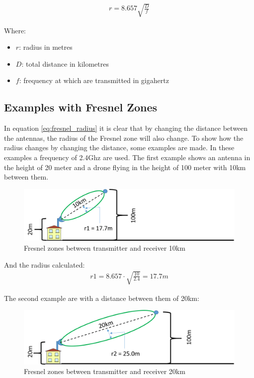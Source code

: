 \begin{align}
r= 8.657 \sqrt{\frac{D}{f}} \label{eq:fresnel_radius}
\end{align}

Where:
\begin{itemize}[label=]
    \item $r$: radius in metres
    \item $D$: total distance in kilometres
    \item $f$: frequency at which are transmitted in gigahertz
\end{itemize}

\subsection{Examples with Fresnel Zones}
\noindent In equation \ref{eq:fresnel_radius} it is clear that by changing the distance between the antennas, the radius of the Fresnel zone will also change. To show how the radius changes by changing the distance, some examples are made. In these examples a frequency of 2.4Ghz are used. The first example shows an antenna in the height of 20 meter and a drone flying in the height of 100 meter with 10km between them.

\begin{figure}[H]
	\centering
	\includegraphics[scale=0.50]{figures/fresnel_10km.png}
	\caption{Fresnel zones between transmitter and receiver 10km}
	\label{fig:fresnel_zones_10km}
\end{figure}  

And the radius calculated:
\begin{align*}
r1 = 8.657\cdot \sqrt{\frac{10}{2.4}} = 17.7m
\end{align*}

The second example are with a distance between them of 20km:

\begin{figure}[H]
	\centering
	\includegraphics[scale=0.50]{figures/fresnel_20km.png}
	\caption{Fresnel zones between transmitter and receiver 20km}
	\label{fig:fresnel_zones_20km}
\end{figure}  

